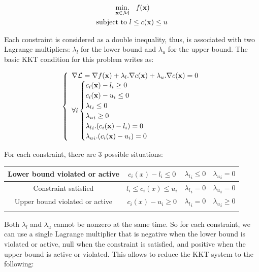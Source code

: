 \begin{align}
\begin{split}
\label{eq:problem}
  \operatorname*{min.}_{\bf x \in \mathcal{M}} & \quad \mbox{\emph{f}}({\bf x}) \\
  \text{subject to }&
  l \leq c({\bf x}) \leq u \\
\end{split}
\end{align}

Each constraint is considered as a double inequality, thus, is associated with two Lagrange multipliers: $\lambda_l$ for the lower bound and $\lambda_u$ for the upper bound.
The basic KKT condition for this problem writes as:

\begin{equation}
\label{KKT}
\left\{
\begin{array}{lr}
  \nabla \mathcal{L} = \nabla f({\bf x}) + \lambda_l.\nabla c({\bf x}) + \lambda_u.\nabla
c({\bf x}) = 0 \\
  \forall i
  \begin{cases}
  c_i({\bf x}) - l_i \geq 0 \\
  c_i({\bf x}) - u_i \leq 0 \\
  {\lambda_l}_i \leq 0 \\
  {\lambda_u}_i \geq 0 \\
  {\lambda_l}_i.(c_i({\bf x})-l_i) = 0 \\
  {\lambda_u}_i.(c_i({\bf x})-u_i) = 0
  \end{cases}
\end{array}
\right.
\end{equation}

For each constraint, there are 3 possible situations:

\begin{tabular}{cccc}
  \\ \toprule
  Lower bound violated or active & $c_i(x)-l_i\leq0$ & ${\lambda_l}_i\leq0$ & ${\lambda_u}_i=0$ \\
  \midrule
  Constraint satisfied & $l_i\leq c_i(x) \leq u_i$ & ${\lambda_l}_i=0$ & ${\lambda_u}_i=0$ \\
  \midrule
  Upper bound violated or active & $c_i(x)-u_i\geq0$ & ${\lambda_l}_i=0$ & ${\lambda_u}_i\geq0$ \\
  \bottomrule \\
\end{tabular}

Both $\lambda_l$ and $\lambda_u$ cannot be nonzero at the same time.
So for each constraint, we can use a single Lagrange multiplier that is negative when the lower bound is violated or active, null when the constraint is satisfied, and positive when the upper bound is active or violated.
This allows to reduce the KKT system to the following:

